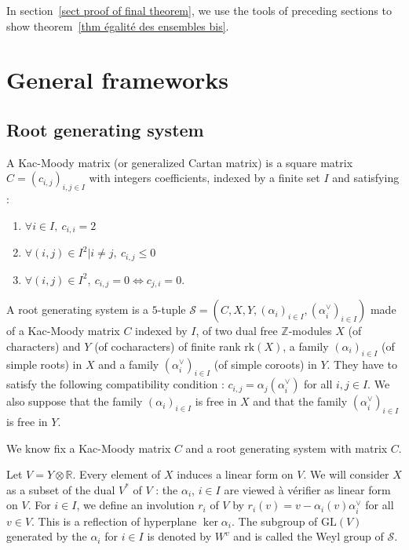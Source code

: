 \documentclass[12pt]{article}
\theoremstyle{plain}
\theoremstyle{definition}
\newcommand{\R}{\mathbb{R}}
\newcommand{\Z}{\mathbb{Z}}
\begin{document}
 In section~\ref{sect proof of final theorem}, we use the tools of preceding sections to show theorem~\ref{thm égalité des ensembles bis}. 


\section{General frameworks}\label{sect general frameworks}
\subsection{Root generating system}
A Kac-Moody matrix (or generalized Cartan matrix) is a square matrix $C=(c_{i,j})_{i,j\in I}$ with integers coefficients, indexed by  a finite set $I$ and satisfying : 
\begin{enumerate}
\item $\forall i\in I,\ c_{i,i}=2$

\item $\forall (i,j)\in I^2|i \neq j,\ c_{i,j}\leq 0$

\item $\forall (i,j)\in I^2,\ c_{i,j}=0 \Leftrightarrow c_{j,i}=0$.
\end{enumerate}

A root generating system is a $5$-tuple $\mathcal{S}=(C,X,Y,(\alpha_i)_{i\in I},(\alpha_i^\vee)_{i\in I})$ made of a Kac-Moody matrix $C$ indexed by $I$, of two dual free $\Z$-modules $X$ (of characters) and $Y$ (of cocharacters) of finite rank $\mathrm{rk}(X)$, a family $(\alpha_i)_{i\in I}$ (of simple roots) in $X$ and a family $(\alpha_i^\vee)_{i\in I}$ (of simple coroots) in $Y$. They have to satisfy the following compatibility condition : $c_{i,j}=\alpha_j(\alpha_i^\vee)$ for all $i,j\in I$. We also suppose that the family $(\alpha_i)_{i\in I}$ is free in $X$ and that the family $(\alpha_i^\vee)_{i\in I}$ is free in $Y$.



 We know fix a Kac-Moody matrix $C$ and a root generating system with matrix $C$.



Let $V=Y\otimes \R$. Every element of $X$ induces a linear form on $V$. We will consider $X$ as a subset of the dual $V^*$ of $V$ : the $\alpha_i$, $i\in I$ are viewed à vérifier as linear form on $V$. For $i\in I$, we define an involution $r_i$ of $V$ by $r_i(v)=v-\alpha_i(v)\alpha_i^\vee$ for all $v\in V$. This is a reflection of hyperplane $\ker \alpha_i$. The subgroup of $\mathrm{GL}(V)$ generated by the $\alpha_i$ for $i\in I$ is denoted by $W^v$ and is called the Weyl group of $\mathcal S$.
\end{document}
